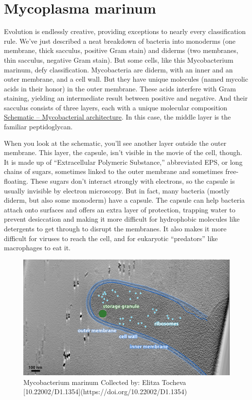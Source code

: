 \documentclass[]{tufte-book}
\begin{document}
\section{Mycoplasma marinum}\label{mycoplasma-marinum}

Evolution is endlessly creative, providing exceptions to nearly every
classification rule. We've just described a neat breakdown of bacteria
into monoderms (one membrane, thick sacculus, positive Gram stain) and
diderms (two membranes, thin sacculus, negative Gram stain). But some
cells, like this Mycobacterium marinum, defy classification.
Mycobacteria are diderm, with an inner and an outer membrane, and a cell
wall. But they have unique molecules (named mycolic acids in their
honor) in the outer membrane. These acids interfere with Gram staining,
yielding an intermediate result between positive and negative. And their
sacculus consists of three layers, each with a unique molecular
composition \protect\hyperlink{Mycobacterial_architecture}{Schematic --
Mycobacterial architecture}. In this case, the middle layer is the
familiar peptidoglycan.

When you look at the schematic, you'll see another layer outside the
outer membrane. This layer, the capsule, isn't visible in the movie of
the cell, though. It is made up of ``Extracellular Polymeric
Substance,'' abbreviated EPS, or long chains of sugars, sometimes linked
to the outer membrane and sometimes free-floating. These sugars don't
interact strongly with electrons, so the capsule is usually invisible by
electron microscopy. But in fact, many bacteria (mostly diderm, but also
some monoderm) have a capsule. The capsule can help bacteria attach onto
surfaces and offers an extra layer of protection, trapping water to
prevent desiccation and making it more difficult for hydrophobic
molecules like detergents to get through to disrupt the membranes. It
also makes it more difficult for viruses to reach the cell, and for
eukaryotic ``predators'' like macrophages to eat it.

\begin{figure}
\includegraphics{img/2_5_Mmarinum} \caption[Mycobacterium marinum Collected by]{Mycobacterium marinum Collected by: Elitza Tocheva [10.22002/D1.1354](https://doi.org/10.22002/D1.1354)}\label{fig:unnamed-chunk-15}
\end{figure}
\end{document}
